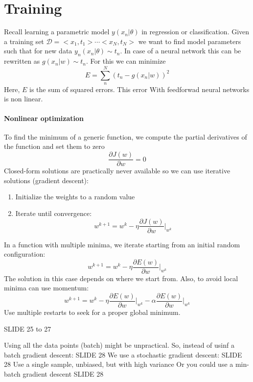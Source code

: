 \section{Training}

Recall learning a parametric model $y(x_n|\theta)$ in regression or classification.
Given a training set $\mathcal{D}=<x_1,t_1>\cdots<x_N,t_N>$ we want to find model parameters such that for new data $y_n(x_n|\theta)\sim t_n$.
In case of a neural network this can be rewritten as $g(x_n|w)\sim t_n$. 
For this we can minimize 
\[E=\sum_n^N\left(t_n-g(x_n|w)\right)^2\]
Here, $E$ is the sum of squared errors. 
This error With feedforwad neural networks is non linear.

\paragraph*{Nonlinear optimization}
To find the minimum of a generic function, we compute the partial derivatives of the function and set them to zero
\[\dfrac{\partial J(w)}{\partial w}=0\]
Closed-form solutions are practically never available so we can use
iterative solutions (gradient descent):
\begin{enumerate}
    \item Initialize the weights to a random value
    \item Iterate until convergence: 
        \[w^{k+1}=w^k-\eta\dfrac{\partial J(w)}{\partial w}\Bigg|_{w^k}\]
\end{enumerate}
In a function with multiple minima, we iterate starting from an initial
random configuration: 
\[w^{k+1}=w^k-\eta\dfrac{\partial E(w)}{\partial w}\Bigg|_{w^k}\]
The solution in this case depends on where we start from.
Also, to avoid local minima can use momentum: 
\[w^{k+1}=w^k-\eta\dfrac{\partial E(w)}{\partial w}\Bigg|_{w^k}-\alpha\dfrac{\partial E(w)}{\partial w}\Bigg|_{w^k}\]
Use multiple restarts to seek for a proper global minimum.

\begin{example}
    SLIDE 25 to 27
\end{example}

Using all the data points (batch) might be unpractical. 
So, instead of usinf a batch gradient descent: 
SLIDE 28
We use a stochastic gradient descent: 
SLIDE 28 
Use a single sample,
unbiased, but with
high variance
Or you could use a min-batch gradient descent
SLIDE 28










